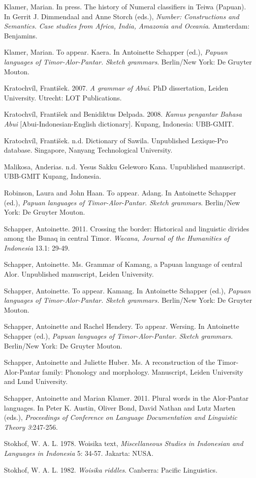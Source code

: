 Klamer, Marian. In press. The history of Numeral classifiers in Teiwa (Papuan). In Gerrit J. Dimmendaal and Anne Storch (eds.), \textit{Number: Constructions and Semantics. Case studies from Africa, India, Amazonia and Oceania}. Amsterdam: Benjamins. 

Klamer, Marian. To appear. Kaera. In Antoinette Schapper\textit{ }(ed.), \textit{Papuan languages of Timor-Alor-Pantar. Sketch grammars}. Berlin/New York: De Gruyter Mouton.

Kratochv\'il, Franti\v{s}ek. 2007. \textit{A grammar of Abui}. PhD dissertation, Leiden University. Utrecht: LOT Publications.

Kratochv\'il, Franti\v{s}ek and Benidiktus Delpada. 2008. \textit{Kamus pengantar Bahasa Abui} [Abui-Indonesian-English dictionary]. Kupang, Indonesia: UBB-GMIT.

Kratochv\'il, Franti\v{s}ek. n.d. Dictionary of Sawila. Unpublished Lexique-Pro database. Singapore, Nanyang Technological University. 

Malikosa, Anderias. n.d. Yesus Sakku Geleworo Kana. Unpublished manuscript. UBB-GMIT Kupang, Indonesia.

Robinson, Laura and John Haan. To appear. Adang. In Antoinette Schapper\textit{ }(ed.), \textit{Papuan languages of Timor-Alor-Pantar. Sketch grammars}. Berlin/New York: De Gruyter Mouton.

Schapper, Antoinette. 2011. Crossing the border: Historical and linguistic divides among the Bunaq in central Timor. \textit{Wacana, Journal of the Humanities of Indonesia} 13.1: 29-49.

Schapper, Antoinette. Ms. Grammar of Kamang, a Papuan language of central Alor. Unpublished manuscript, Leiden University.

Schapper, Antoinette. To appear. Kamang. In Antoinette Schapper\textit{ }(ed.), \textit{Papuan languages of Timor-Alor-Pantar. Sketch grammars. }Berlin/New York: De Gruyter Mouton.\textit{ }

Schapper, Antoinette and Rachel Hendery. To appear. Wersing. In Antoinette Schapper (ed.), \textit{Papuan languages of Timor-Alor-Pantar. Sketch grammars. }Berlin/New York: De Gruyter Mouton.

Schapper, Antoinette and Juliette Huber. Ms. A reconstruction of the Timor-Alor-Pantar family: Phonology and morphology. Manuscript, Leiden University and Lund University.

Schapper, Antoinette and Marian Klamer. 2011. Plural words in the Alor-Pantar languages. In Peter K. Austin, Oliver Bond, David Nathan and Lutz Marten (eds.), \textit{Proceedings of Conference on Language Documentation and Linguistic Theory 3}:247-256.  

Stokhof, W. A. L. 1978. Woisika text, \textit{Miscellaneous Studies in Indonesian and Languages in Indonesia} 5: 34-57. Jakarta:  NUSA.

Stokhof, W. A. L. 1982. \textit{Woisika riddles}. Canberra: Pacific Linguistics.

